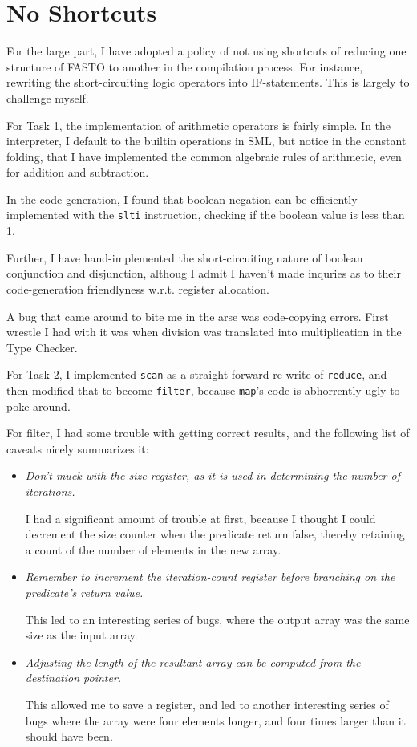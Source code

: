 \documentclass[12pt, a4paper]{article}
\begin{document}
\section{No Shortcuts}

For the large part, I have adopted a policy of not using shortcuts of reducing one
structure of FASTO to another in the compilation process. For instance, rewriting
the short-circuiting logic operators into IF-statements. This is largely to challenge
myself.

For Task 1, the implementation of arithmetic operators is fairly simple. In the
interpreter, I default to the builtin operations in SML, but notice in the constant
folding, that I have implemented the common algebraic rules of arithmetic, even
for addition and subtraction.

In the code generation, I found that boolean negation can be efficiently implemented with the
\texttt{slti} instruction, checking if the boolean value is less than 1.

Further, I have hand-implemented the short-circuiting nature of boolean conjunction and disjunction,
althoug I admit I haven't made inquries as to their code-generation friendlyness w.r.t. register
allocation.

A bug that came around to bite me in the arse was code-copying errors. First wrestle I had with
it was when division was translated into multiplication in the Type Checker.

For Task 2, I implemented \texttt{scan} as a straight-forward re-write of \texttt{reduce},
and then modified that to become \texttt{filter}, because \texttt{map}'s code is abhorrently
ugly to poke around.

For filter, I had some trouble with getting correct results, and the following list of
caveats nicely summarizes it:
\begin{itemize}
    \item \textit{Don't muck with the size register, as it is used in determining the
        number of iterations.}

        I had a significant amount of trouble at first, because I thought I could decrement
        the size counter when the predicate return false, thereby retaining a count of
        the number of elements in the new array.

    \item \textit{Remember to increment the iteration-count register before branching
        on the predicate's return value.}

        This led to an interesting series of bugs, where the output array was the
        same size as the input array.
    \item \textit{Adjusting the length of the resultant array can be computed from
        the destination pointer.}

        This allowed me to save a register, and led to another interesting series
        of bugs where the array were four elements longer, and four times larger
        than it should have been.
\end{itemize}
\end{document}

